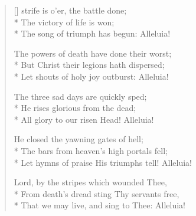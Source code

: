 \newHymn
{}
\settowidth{\versewidth}{The strife is o'er, the battle done}

\begin{verse}[\versewidth]
 strife is o'er, the battle done;\\*
The victory of life is won;\\*
The song of triumph has begun: Alleluia!



The powers of death have done their worst;\\*
But Christ their legions hath dispersed;\\*
Let shouts of holy joy outburst: Alleluia!


The three sad days are quickly sped;\\*
He rises glorious from the dead;\\*
All glory to our risen Head! Alleluia!


He closed the yawning gates of hell;\\*
The bars from heaven's high portals fell;\\*
Let hymns of praise His triumphs tell! Alleluia!


Lord, by the stripes which wounded Thee,\\*
From death's dread sting Thy servants free,\\*
That we may live, and sing to Thee: Alleluia!

\end{verse}

